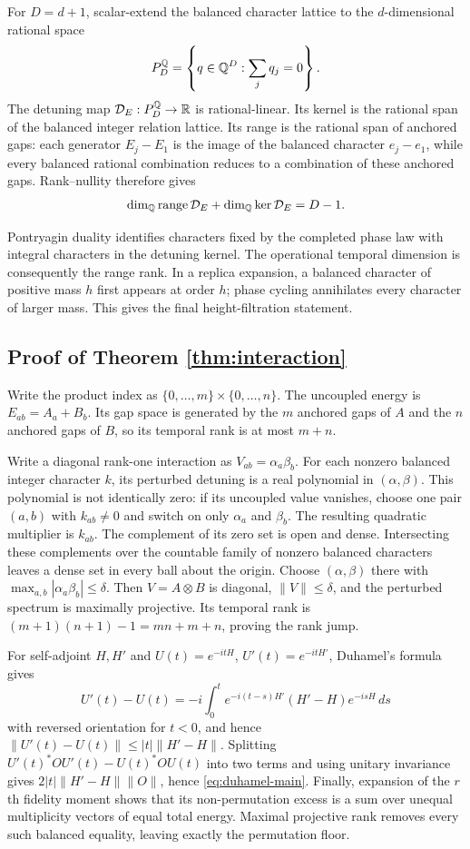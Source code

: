 For $D=d+1$, scalar-extend the balanced character lattice to the
$d$-dimensional rational space
\[
 P_D^{\mathbb Q}=\left\{q\in\mathbb Q^D:\sum_jq_j=0\right\}.
\]
The detuning map $\mathcal D_E:P_D^{\mathbb Q}\to\mathbb R$ is rational-linear.  Its
kernel is the rational span of the balanced integer relation lattice.  Its
range is the rational span of anchored gaps: each generator $E_j-E_1$ is the
image of the balanced character $e_j-e_1$, while every balanced rational
combination reduces to a combination of these anchored gaps.  Rank--nullity
therefore gives
\[
 \dim_{\mathbb Q}\operatorname{range}\mathcal D_E+
 \dim_{\mathbb Q}\ker\mathcal D_E=D-1.
\]

Pontryagin duality identifies characters fixed by the completed phase law
with integral characters in the detuning kernel.  The operational temporal
dimension is consequently the range rank.  In a replica expansion, a
balanced character of positive mass $h$ first appears at order $h$; phase
cycling annihilates every character of larger mass.  This gives the final
height-filtration statement.

\subsection{Proof of Theorem \ref{thm:interaction}}

Write the product index as
$\{0,\ldots,m\}\times\{0,\ldots,n\}$.  The uncoupled energy is
$E_{ab}=A_a+B_b$.  Its gap space is generated by the $m$ anchored gaps of
$A$ and the $n$ anchored gaps of $B$, so its temporal rank is at most $m+n$.

Write a diagonal rank-one interaction as
$V_{ab}=\alpha_a\beta_b$.  For each nonzero balanced integer character $k$,
its perturbed detuning is a real polynomial in $(\alpha,\beta)$.  This
polynomial is not identically zero: if its uncoupled value vanishes, choose
one pair $(a,b)$ with $k_{ab}\ne0$ and switch on only $\alpha_a$ and
$\beta_b$.  The resulting quadratic multiplier is $k_{ab}$.  The complement
of its zero set is open and dense.  Intersecting these complements over the
countable family of nonzero balanced characters leaves a dense set in every
ball about the origin.  Choose $(\alpha,\beta)$ there with
$\max_{a,b}|\alpha_a\beta_b|\le\delta$.  Then $V=A\otimes B$ is diagonal,
$\|V\|\le\delta$, and the perturbed spectrum is maximally projective.  Its
temporal rank is $(m+1)(n+1)-1=mn+m+n$, proving the rank jump.

For self-adjoint $H,H'$ and $U(t)=e^{-itH}$,
$U'(t)=e^{-itH'}$, Duhamel's formula gives
\[
 U'(t)-U(t)=-i\int_0^t e^{-i(t-s)H'}(H'-H)e^{-isH}\,ds
\]
with reversed orientation for $t<0$, and hence
$\|U'(t)-U(t)\|\le |t|\|H'-H\|$.  Splitting
$U'(t)^*OU'(t)-U(t)^*OU(t)$ into two terms and using unitary invariance gives
$2|t|\|H'-H\|\|O\|$, hence \eqref{eq:duhamel-main}.  Finally, expansion of the $r$th fidelity moment
shows that its non-permutation excess is a sum over unequal multiplicity
vectors of equal total energy.  Maximal projective rank removes every such
balanced equality, leaving exactly the permutation floor.

